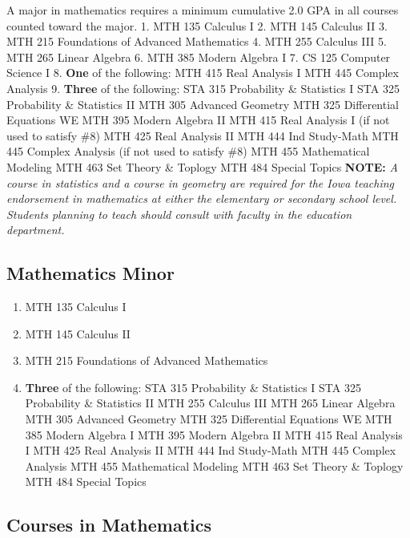 \documentclass[
  letterpaper,
]{scrbook}
\providecommand{\tightlist}{%
  \setlength{\itemsep}{0pt}\setlength{\parskip}{0pt}}
\begin{document}
A major in mathematics requires a minimum cumulative 2.0 GPA in all
courses counted toward the major. 1. MTH 135 Calculus I 2. MTH 145
Calculus II 3. MTH 215 Foundations of Advanced Mathematics 4. MTH 255
Calculus III 5. MTH 265 Linear Algebra 6. MTH 385 Modern Algebra I 7. CS
125 Computer Science I 8. \textbf{One} of the following: MTH 415 Real
Analysis I MTH 445 Complex Analysis 9. \textbf{Three} of the following:
STA 315 Probability \& Statistics I STA 325 Probability \& Statistics II
MTH 305 Advanced Geometry MTH 325 Differential Equations WE MTH 395
Modern Algebra II MTH 415 Real Analysis I (if not used to satisfy \#8)
MTH 425 Real Analysis II MTH 444 Ind Study-Math MTH 445 Complex Analysis
(if not used to satisfy \#8) MTH 455 Mathematical Modeling MTH 463 Set
Theory \& Toplogy MTH 484 Special Topics \textbf{NOTE:} \emph{A course
in statistics and a course in geometry are required for the Iowa
teaching endorsement in mathematics at either the elementary or
secondary school level. Students planning to teach should consult with
faculty in the education department. }

\hypertarget{mathematics-minor}{%
\subsection{Mathematics Minor}\label{mathematics-minor}}

\begin{enumerate}
\def\labelenumi{\arabic{enumi}.}
\tightlist
\item
  MTH 135 Calculus I
\item
  MTH 145 Calculus II
\item
  MTH 215 Foundations of Advanced Mathematics
\item
  \textbf{Three} of the following: STA 315 Probability \& Statistics I
  STA 325 Probability \& Statistics II MTH 255 Calculus III MTH 265
  Linear Algebra MTH 305 Advanced Geometry MTH 325 Differential
  Equations WE MTH 385 Modern Algebra I MTH 395 Modern Algebra II MTH
  415 Real Analysis I MTH 425 Real Analysis II MTH 444 Ind Study-Math
  MTH 445 Complex Analysis MTH 455 Mathematical Modeling MTH 463 Set
  Theory \& Toplogy MTH 484 Special Topics
\end{enumerate}

\hypertarget{courses-in-mathematics}{%
\subsection{Courses in Mathematics}\label{courses-in-mathematics}}
\end{document}

